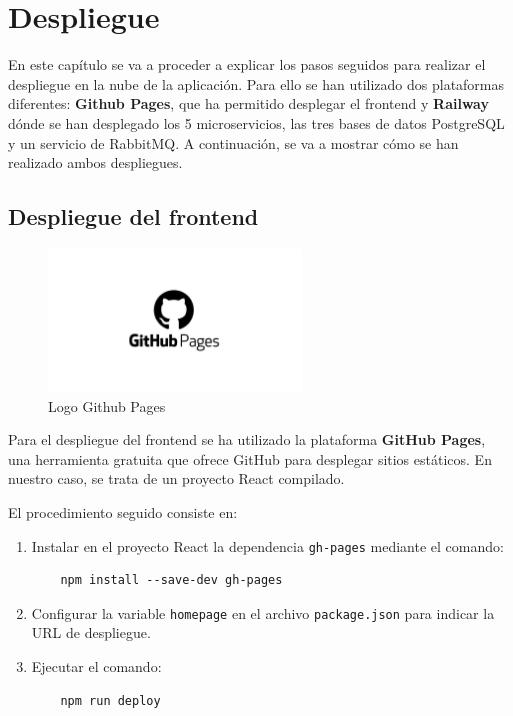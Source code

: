 \chapter{Despliegue} \label{despliegue}

En este capítulo se va a proceder a explicar los pasos seguidos para realizar el despliegue en la nube de la aplicación. Para ello se han utilizado dos plataformas diferentes: \textbf{Github Pages}, que ha permitido desplegar el frontend y \textbf{Railway} \cite{Railway} dónde se han desplegado los 5 microservicios, las tres bases de datos PostgreSQL y un servicio de RabbitMQ. A continuación, se va a mostrar cómo se han realizado ambos despliegues.

\section{Despliegue del frontend}
\begin{figure}[H]
  \centering
  \includegraphics[width=0.6\textwidth]{fotos/pages.jpg}
  \caption{Logo Github Pages}
  \label{fig:pages}
\end{figure}
Para el despliegue del frontend se ha utilizado la plataforma \textbf{GitHub Pages}, una herramienta gratuita que ofrece GitHub para desplegar sitios estáticos. En nuestro caso, se trata de un proyecto React compilado. 

El procedimiento seguido consiste en:

\begin{enumerate}
    \item Instalar en el proyecto React la dependencia \texttt{gh-pages} mediante el comando:
    \begin{verbatim}
    npm install --save-dev gh-pages
    \end{verbatim}
    
    \item Configurar la variable \texttt{homepage} en el archivo \texttt{package.json} para indicar la URL de despliegue.
    
    \item Ejecutar el comando:
    \begin{verbatim}
    npm run deploy
    \end{verbatim}
\end{enumerate}

